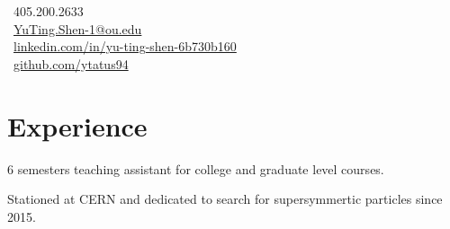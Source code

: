 \documentclass[letterpaper]{deedy-resume-openfont}
\begin{document}
%
%
\lastupdated

%
%

{
    \faPhone \ 405.200.2633\\
    \faEnvelope \ \href{mailto:YuTing.Shen-1@ou.edu}{YuTing.Shen-1@ou.edu}\\
    \faLinkedinSquare \ \href{https://www.linkedin.com/in/yu-ting-shen-6b730b160/}{linkedin.com/in/yu-ting-shen-6b730b160}\\
    \faGithub \ \href{https://github.com/ytatus94}{github.com/ytatus94}
}




\section{Experience}

\begin{tightemize}
\item 6 semesters teaching assistant for college and graduate level courses.
\item Stationed at CERN and dedicated to search for supersymmertic particles since 2015.
\end{tightemize}
\sectionsep
\end{document}
